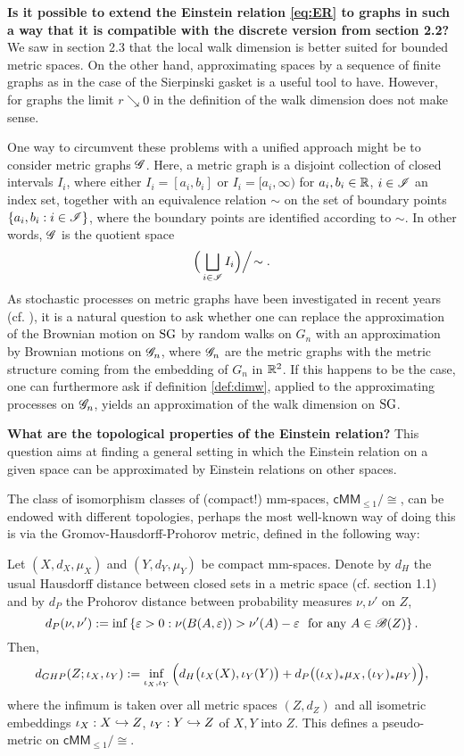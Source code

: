 \textbf{Is it possible to extend the Einstein relation \eqref{eq:ER} to graphs in such a way that it is compatible with the discrete version from section 2.2?}
We saw in section 2.3 that the local walk dimension is better suited for bounded metric spaces. On the other hand, approximating spaces by a sequence of finite graphs as in the case of the Sierpinski gasket is a useful tool to have. However, for graphs the limit $r\searrow0$ in the definition of the walk dimension does not make sense. 

One way to circumvent these problems with a unified approach might be to consider metric graphs $\mathscr{G}$. Here, a metric graph is a disjoint collection of closed intervals $I_i$, where either $I_i=[a_i,b_i]$ or $I_i=[a_i,\infty)$ for $a_i,b_i\in\mathbb{R}$, $i\in\mathscr{I}$ an index set, together with an equivalence relation $\sim$ on the set of boundary points $\{a_i,b_i:i\in\mathscr{I}\}$, where the boundary points are identified according to $\sim$. In other words, $\mathscr{G}$ is the quotient space
\[
  \Big(\bigsqcup_{i\in\mathscr{I}} I_i\Big)\Big/\!\sim.
\]
As stochastic processes on metric graphs have been investigated in recent years (cf. \cite{werner2016brownian}), it is a natural question to ask whether one can replace the approximation of the Brownian motion on $\operatorname{SG}$ by random walks on $G_n$ with an approximation by Brownian motions on $\mathscr{G}_n$, where $\mathscr{G}_n$ are the metric graphs with the metric structure coming from the embedding of $G_n$ in $\mathbb{R}^2$. If this happens to be the case, one can furthermore ask if definition \ref{def:dimw}, applied to the approximating processes on $\mathscr{G}_n$, yields an approximation of the walk dimension on $\operatorname{SG}$. 

\textbf{What are the topological properties of the Einstein relation?} This question aims at finding a general setting in which the Einstein relation on a given space can be approximated by Einstein relations on other spaces.

The class of isomorphism classes of (compact!) mm-spaces, 
$\mathsf{cMM}_{\leq1}\big/\!\cong$, can be endowed with different topologies, perhaps the most well-known way of doing this is via the Gromov-Hausdorff-Prohorov metric, defined in the following way: 
  
Let $(X,d_X,\mu_X)$ and $(Y,d_Y,\mu_Y)$ be compact mm-spaces. Denote by $d_H$ the usual Hausdorff distance between closed sets in a metric space (cf. section 1.1) and by $d_P$ the Prohorov distance between probability measures $\nu,\nu'$ on $Z$,
\[
  d_P(\nu,\nu'):=\inf\left\{\varepsilon>0: \nu(B(A,\varepsilon))>\nu'(A)-\varepsilon\
    \text{ for any } A\in\mathscr{B}(Z)\right\}.
\]  
Then,
\[
  d_{GHP}(Z;\iota_X,\iota_Y):=\inf_{\iota_X,\iota_Y}
     \Big(d_H\big(\iota_X(X),\iota_Y(Y)\big)
     +d_P\big((\iota_X)_*\mu_X,(\iota_Y)_*\mu_Y\big)\Big),
\]
where the infimum is taken over all metric spaces $(Z,d_Z)$ and all isometric embeddings $\iota_X:X\hookrightarrow Z$, 
$\iota_Y:Y\hookrightarrow Z$ of $X,Y$ into $Z$. This defines a pseudo-metric on $\mathsf{cMM}_{\leq1}\big/\!\cong$. 
  
